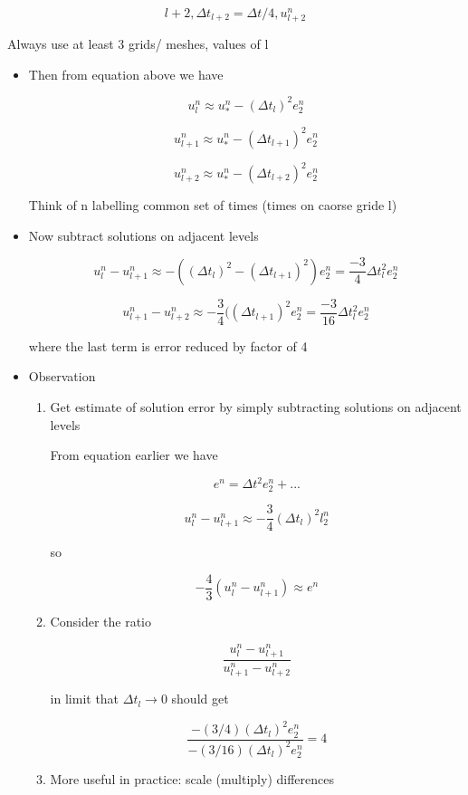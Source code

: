 \[ l+2, \Delta t_{l+2} = \Delta t/4, u_{l+2}^n\]

Always use at least 3 grids/ meshes, values of l
\begin{itemize}
    \item Then from equation above we have

    \[ u_l^n \approx u_*^n - (\Delta t_l)^2 e_2^n\]

    \[ u^n_{l+1} \approx u_*^n - (\Delta t_{l+1})^2 e_2^n\]

    \[ u^n_{l+2} \approx u_*^n - (\Delta t_{l+2})^2 e_2^n\]

    Think of n labelling common set of times (times on caorse gride l)

    \item Now subtract solutions on adjacent levels 

    \[ u_l^n-u_{l+1}^n \approx -((\Delta t_l)^2 - (\Delta t_{l+1})^2)e_2^n = \frac{-3}{4} \Delta t_l^2 e^n_2\]

     \[ u_{l+1}^n-u_{l+2}^n \approx - \frac{3}{4}((\Delta t_{l+1})^2 e_2^n = \frac{-3}{16} \Delta t^2_l e^n_2\]

     where the last term is error reduced by factor of 4

     \item Observation 

     \begin{enumerate}
         \item Get estimate of solution error by simply subtracting solutions on adjacent levels

         From equation earlier we have 

         \[ e^n = \Delta t^2 e_2^n + ...\]

         \[ u_l^n - u^n_{l+1} \approx -\frac{3}{4} (\Delta t_l)^2 l^n_2\]

         so 

         \[ -\frac{4}{3} (u_{l}^n - u_{l+1}^n) \approx e^n\]

         \item Consider the ratio

         \[ \frac{u^n_l - u^n_{l+1}}{u^n_{l+1} - u^n_{l+2}}\]

         in limit that $\Delta t_l \rightarrow 0$ should  get 

         \[ \frac{-(3/4)(\Delta t_l)^2 e_2^n}{-(3/16)(\Delta t_l)^2 e^n_2} = 4\]

         \item More useful in practice: scale (multiply) differences


\end{enumerate}
\end{itemize}
